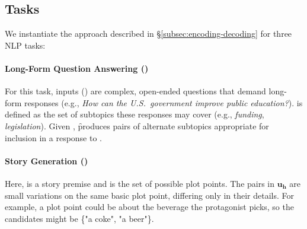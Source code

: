 
\subsection{Tasks}
\label{subsec:tasks}
We instantiate the approach described in \S\ref{subsec:encoding-decoding} for three NLP tasks:

\paragraph{Long-Form Question Answering (\qa)} For this task, inputs (\inp) are complex, open-ended questions that demand long-form responses (e.g., \emph{How can the U.S.\ government improve public education?}). \units is defined as the set of subtopics these responses may cover (e.g., \emph{funding}, \emph{legislation}). Given \inp, \f produces pairs of alternate subtopics appropriate for inclusion in a response to \inp.


\paragraph{Story Generation (\sg)} Here, \inp is a story premise and \units is the set of possible plot points. The pairs in $\mathbf{u}_\mathbf{h}$ are small variations on the same basic plot point, differing only in their details.
For example, a plot point could be about the beverage the protagonist picks, so the candidates might be \{"a coke", "a beer"\}.

